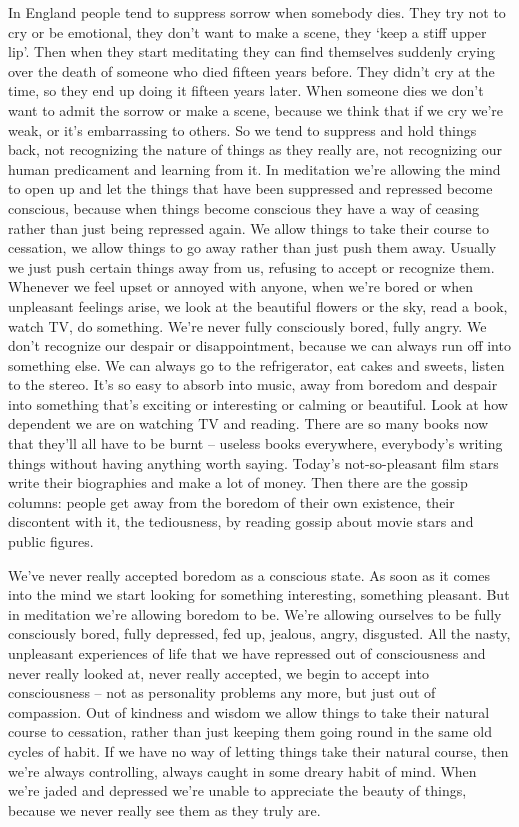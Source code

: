 In England people tend to suppress sorrow when somebody dies. They try not to cry or be emotional, they don't want to make a scene, they `keep a stiff upper lip'. Then when they start meditating they can find themselves suddenly crying over the death of someone who died fifteen years before. They didn't cry at the time, so they end up doing it fifteen years later. When someone dies we don't want to admit the sorrow or make a scene, because we think that if we cry we're weak, or it's embarrassing to others. So we tend to suppress and hold things back, not recognizing the nature of things as they really are, not recognizing our human predicament and learning from it. In meditation we're allowing the mind to open up and let the things that have been suppressed and repressed become conscious, because when things become conscious they have a way of ceasing rather than just being repressed again. We allow things to take their course to cessation, we allow things to go away rather than just push them away. Usually we just push certain things away from us, refusing to accept or recognize them. Whenever we feel upset or annoyed with anyone, when we're bored or when unpleasant feelings arise, we look at the beautiful flowers or the sky, read a book, watch TV, do something. We're never fully consciously bored, fully angry. We don't recognize our despair or disappointment, because we can always run off into something else. We can always go to the refrigerator, eat cakes and sweets, listen to the stereo. It's so easy to absorb into music, away from boredom and despair into something that's exciting or interesting or calming or beautiful. Look at how dependent we are on watching TV and reading. There are so many books now that they'll all have to be burnt -- useless books everywhere, everybody's writing things without having anything worth saying. Today's not-so-pleasant film stars write their biographies and make a lot of money. Then there are the gossip columns: people get away from the boredom of their own existence, their discontent with it, the tediousness, by reading gossip about movie stars and public figures.

We've never really accepted boredom as a conscious state. As soon as it comes into the mind we start looking for something interesting, something pleasant. But in meditation we're allowing boredom to be. We're allowing ourselves to be fully consciously bored, fully depressed, fed up, jealous, angry, disgusted. All the nasty, unpleasant experiences of life that we have repressed out of consciousness and never really looked at, never really accepted, we begin to accept into consciousness -- not as personality problems any more, but just out of compassion. Out of kindness and wisdom we allow things to take their natural course to cessation, rather than just keeping them going round in the same old cycles of habit. If we have no way of letting things take their natural course, then we're always controlling, always caught in some dreary habit of mind. When we're jaded and depressed we're unable to appreciate the beauty of things, because we never really see them as they truly are.

